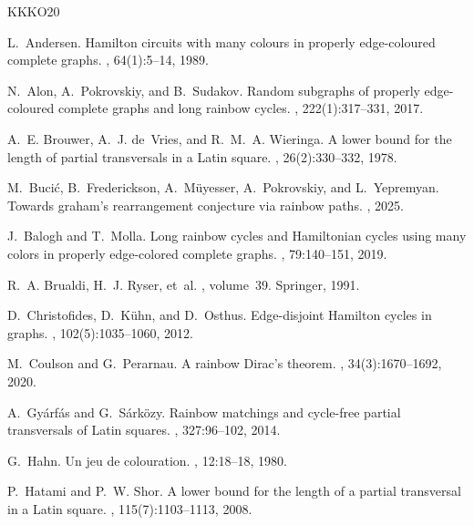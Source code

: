 \documentclass[11pt,reqno]{amsart}
\theoremstyle{definition}
\theoremstyle{remark}
\begin{document}
\newcommand{\etalchar}[1]{$^{#1}$}
\begin{thebibliography}{KKKO20}

L.~Andersen.
\newblock Hamilton circuits with many colours in properly edge-coloured complete graphs.
, 64(1):5--14, 1989.

N.~Alon, A.~Pokrovskiy, and B.~Sudakov.
\newblock Random subgraphs of properly edge-coloured complete graphs and long rainbow cycles.
, 222(1):317--331, 2017.

A.~E. Brouwer, A.~J. de~Vries, and R.~M.~A. Wieringa.
\newblock A lower bound for the length of partial transversals in a {L}atin square.
, 26(2):330--332, 1978.

\bibitem[BFM{\etalchar{+}}25]{BFMPY}
M.~Buci{\'c}, B.~Frederickson, A.~M{\"u}yesser, A.~Pokrovskiy, and L.~Yepremyan.
\newblock Towards graham's rearrangement conjecture via rainbow paths.
, 2025.

J.~Balogh and T.~Molla.
\newblock Long rainbow cycles and {H}amiltonian cycles using many colors in properly edge-colored complete graphs.
, 79:140--151, 2019.

\bibitem[BR{\etalchar{+}}91]{BR}
R.~A. Brualdi, H.~J. Ryser, et~al.
, volume~39.
\newblock Springer, 1991.

D.~Christofides, D.~K{\"u}hn, and D.~Osthus.
\newblock Edge-disjoint {H}amilton cycles in graphs.
, 102(5):1035--1060, 2012.

M.~Coulson and G.~Perarnau.
\newblock A rainbow {D}irac's theorem.
, 34(3):1670--1692, 2020.

A.~Gy\'{a}rf\'{a}s and G.~S\'{a}rk\"{o}zy.
\newblock Rainbow matchings and cycle-free partial transversals of {L}atin squares.
, 327:96--102, 2014.

G.~Hahn.
\newblock Un jeu de colouration.
, 12:18--18, 1980.

P.~Hatami and P.~W. Shor.
\newblock A lower bound for the length of a partial transversal in a {L}atin square.
, 115(7):1103--1113, 2008.


\end{thebibliography}
\end{document}
